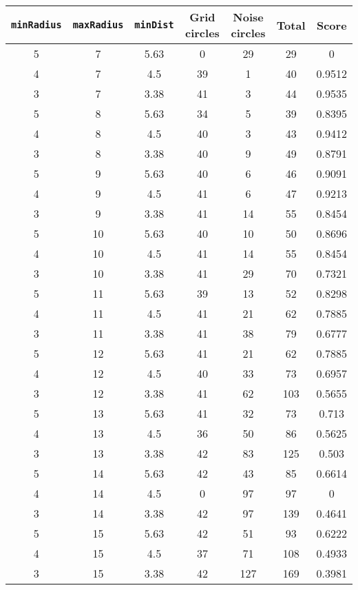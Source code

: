 \documentclass[letterpaper, 12pt]{article}
\begin{document}
\begin{longtable}{|c|c|c|c|c|c|c|}
\hline
\textbf{\texttt{minRadius}} & \textbf{\texttt{maxRadius}} & \textbf{\texttt{minDist}} & \textbf{Grid circles} & \textbf{Noise circles} & \textbf{Total} & \textbf{Score} \\
\hline
5 & 7 & 5.63 & 0 & 29 & 29 & 0 \\
\hline
4 & 7 & 4.5 & 39 & 1 & 40 & 0.9512 \\
\hline
3 & 7 & 3.38 & 41 & 3 & 44 & 0.9535 \\
\hline
5 & 8 & 5.63 & 34 & 5 & 39 & 0.8395 \\
\hline
4 & 8 & 4.5 & 40 & 3 & 43 & 0.9412 \\
\hline
3 & 8 & 3.38 & 40 & 9 & 49 & 0.8791 \\
\hline
5 & 9 & 5.63 & 40 & 6 & 46 & 0.9091 \\
\hline
4 & 9 & 4.5 & 41 & 6 & 47 & 0.9213 \\
\hline
3 & 9 & 3.38 & 41 & 14 & 55 & 0.8454 \\
\hline
5 & 10 & 5.63 & 40 & 10 & 50 & 0.8696 \\
\hline
4 & 10 & 4.5 & 41 & 14 & 55 & 0.8454 \\
\hline
3 & 10 & 3.38 & 41 & 29 & 70 & 0.7321 \\
\hline
5 & 11 & 5.63 & 39 & 13 & 52 & 0.8298 \\
\hline
4 & 11 & 4.5 & 41 & 21 & 62 & 0.7885 \\
\hline
3 & 11 & 3.38 & 41 & 38 & 79 & 0.6777 \\
\hline
5 & 12 & 5.63 & 41 & 21 & 62 & 0.7885 \\
\hline
4 & 12 & 4.5 & 40 & 33 & 73 & 0.6957 \\
\hline
3 & 12 & 3.38 & 41 & 62 & 103 & 0.5655 \\
\hline
5 & 13 & 5.63 & 41 & 32 & 73 & 0.713 \\
\hline
4 & 13 & 4.5 & 36 & 50 & 86 & 0.5625 \\
\hline
3 & 13 & 3.38 & 42 & 83 & 125 & 0.503 \\
\hline
5 & 14 & 5.63 & 42 & 43 & 85 & 0.6614 \\
\hline
4 & 14 & 4.5 & 0 & 97 & 97 & 0 \\
\hline
3 & 14 & 3.38 & 42 & 97 & 139 & 0.4641 \\
\hline
5 & 15 & 5.63 & 42 & 51 & 93 & 0.6222 \\
\hline
4 & 15 & 4.5 & 37 & 71 & 108 & 0.4933 \\
\hline
3 & 15 & 3.38 & 42 & 127 & 169 & 0.3981 \\

\end{longtable}
\end{document}
